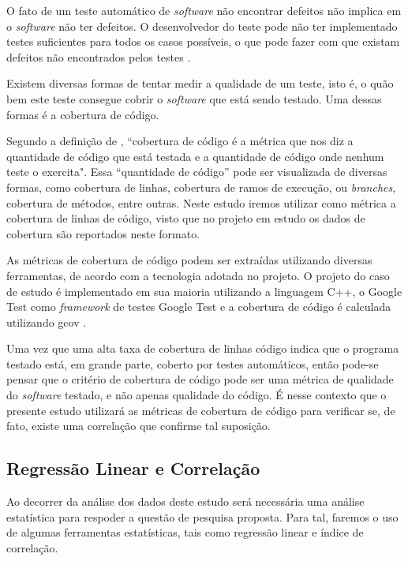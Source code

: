 \documentclass[11.5pt]{article}
\begin{document}
O fato de um teste automático de \textit{software} não encontrar defeitos não implica em o
\textit{software} não ter defeitos.
O desenvolvedor do teste pode não ter implementado testes suficientes para todos os casos possíveis,
o que pode fazer com que existam defeitos não encontrados pelos testes \cite{engSwSommerville}.

Existem diversas formas de tentar medir a qualidade de um teste, isto é, o quão bem este teste
consegue cobrir o \textit{software} que está sendo testado.
Uma dessas formas é a cobertura de código.

Segundo a definição de \cite{tddBook}, ``cobertura de código é a métrica que nos diz a quantidade de
código que está testada e a quantidade de código onde nenhum teste o exercita".
Essa ``quantidade de código'' pode ser visualizada de diversas formas, como cobertura de linhas,
cobertura de ramos de execução, ou \textit{branches}, cobertura de métodos, entre outras.
Neste estudo iremos utilizar como métrica a cobertura de linhas de código, visto que no projeto em
estudo os dados de cobertura são reportados neste formato.

As métricas de cobertura de código podem ser extraídas utilizando diversas ferramentas, de acordo
com a tecnologia adotada no projeto.
O projeto do caso de estudo é implementado em sua maioria utilizando a linguagem C++, o
Google Test \cite{googleTest} como \textit{framework} de testes Google Test \cite{googleTest} e
a cobertura de código é calculada utilizando gcov \cite{gcov}.

Uma vez que uma alta taxa de cobertura de linhas código indica que o programa testado está, em
grande parte, coberto por testes automáticos, então pode-se pensar que o critério de cobertura de
código pode ser uma métrica de qualidade do \textit{software} testado, e não apenas qualidade do
código.
É nesse contexto que o presente estudo utilizará as métricas de cobertura de código para verificar
se, de fato, existe uma correlação que confirme tal suposição.


\subsection{Regressão Linear e Correlação}

Ao decorrer da análise dos dados deste estudo será necessária uma análise estatística para respoder
a questão de pesquisa proposta.
Para tal, faremos o uso de algumas ferramentas estatísticas, tais como regressão linear e índice de
correlação.
\end{document}
